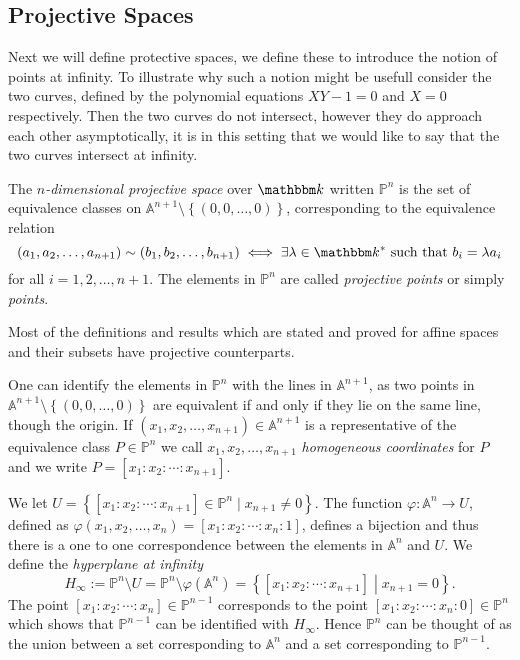 \subsection{Projective Spaces}\label{sec:projective_spaces}
Next we will define protective spaces, we define these to introduce the notion of points at infinity. To illustrate why such a notion might be usefull consider the two curves, defined by the polynomial equations $XY - 1 = 0$ and $X = 0$ respectively. Then the two curves do not intersect, however they do approach each other asymptotically, it is in this setting that we would like to say that the two curves intersect at infinity.
\begin{definition}
  The \textit{$n$-dimensional projective space} over $\K$ written $\mathbb{P}^n$ is the set of equivalence classes on $\mathbb{A}^{n + 1} \setminus \left\{(0, 0, \ldots, 0)\right\}$, corresponding to the equivalence relation
  \begin{equation*}
    (a_1, a_2, \ldots, a_{n + 1}) \sim (b_1, b_2, \ldots, b_{n + 1}) \iff \exists \lambda \in \K^{*} \text{ such that } b_i = \lambda a_i
  \end{equation*}
  for all $i = 1, 2, \ldots, n + 1$. The elements in $\mathbb{P}^{n}$ are called \textit{projective points} or simply \textit{points}.
\end{definition}
Most of the definitions and results which are stated and proved for affine spaces and their subsets have projective counterparts.

One can identify the elements in $\mathbb{P}^{n}$ with the lines in $\mathbb{A}^{n + 1}$, as two points in $\mathbb{A}^{n + 1} \setminus \left\{\left(0, 0, \ldots, 0\right) \right\}$ are equivalent if and only if they lie on the same line, though the origin. If $(x_1, x_2, \ldots, x_{n + 1}) \in \mathbb{A}^{n + 1}$ is a representative of the equivalence class $P \in \mathbb{P}^{n}$ we call $x_1, x_2, \ldots, x_{n + 1}$ \textit{homogeneous coordinates} for $P$ and we write $P = [x_1: x_2 :  \cdots: x_{n + 1}]$.

We let $U = \left\{\left[x_{1} : x_{2} : \cdots : x_{n + 1}\right] \in \mathbb{P}^{n} \mid x_{n + 1} \not= 0\right\}$. The function $\varphi \colon \mathbb{A}^n \to U$, defined as $\varphi(x_1, x_2, \ldots, x_{n}) = \left[x_{1} : x_{2} :  \cdots : x_{n} : 1\right]$, defines a bijection and thus there is a one to one correspondence between the elements in  $\mathbb{A}^{n}$ and $U$. We define the \textit{hyperplane at infinity}
\begin{equation*}
  H_{\infty} := \mathbb{P}^n \setminus U = \mathbb{P}^n \setminus \varphi(\mathbb{A}^{n}) = \left\{\left[x_{1} : x_{2} : \cdots : x_{n + 1}\right] \middle| x_{n + 1} = 0\right\}.
\end{equation*}
The point $\left[x_{1} : x_{2} : \cdots : x_{n}\right] \in \mathbb{P}^{n - 1}$ corresponds to the point $\left[x_{1} : x_{2} : \cdots : x_{n} : 0\right] \in \mathbb{P}^{n}$ which shows that $\mathbb{P}^{n-1}$ can be identified with $H_{\infty}$. Hence $\mathbb{P}^{n}$ can be thought of as the union between a set corresponding to $\mathbb{A}^{n}$ and a set corresponding to $\mathbb{P}^{n - 1}$.

